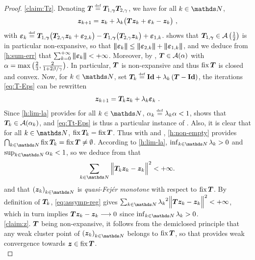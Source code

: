\begin{proof}
\noindent\ref{claim:Tz}.
Denoting $\boldsymbol T \stackrel{\mathrm{\scriptscriptstyle{def}}}{=} \boldsymbol T_{1,\boldsymbol{\gamma}} \boldsymbol T_{2,\gamma}$, we have for all $k \in \N$,
%
\begin{equation}\label{eq:T-Eps}
  \bz_{k+1} = \bz_k + \la_k \bpa{ \bT \bz_k + \bEps_{k} - \bz_k } ~,
\end{equation}
% 
with $\boldsymbol{\varepsilon}_{k} \stackrel{\mathrm{\scriptscriptstyle{def}}}{=} \boldsymbol T_{1,\boldsymbol{\gamma}} \big(  \boldsymbol T_{2,\gamma} \boldsymbol z_k + \boldsymbol{\varepsilon}_{2,k}  \big) - \boldsymbol T_{1,\boldsymbol{\gamma}} \big(  \boldsymbol T_{2,\gamma} \boldsymbol z_k  \big) + \boldsymbol{\varepsilon}_{1,k}$.  shows that $\boldsymbol T_{1,\boldsymbol{\gamma}} \in \mathcal{A}\left(  {\textstyle \frac{1}{2}}  \right)$ is in particular non-expansive, so that $\bm{|\kern-1pt|} \boldsymbol{\varepsilon}_k \bm{|\kern-1pt|} \leq \bm{|\kern-1pt|} \boldsymbol{\varepsilon}_{2,k} \bm{|\kern-1pt|} + \bm{|\kern-1pt|} \boldsymbol{\varepsilon}_{1,k} \bm{|\kern-1pt|}$, and we deduce from \ref{h:sum-err} that $\sum_{k=0}^{{+}\infty} \bm{|\kern-1pt|} \boldsymbol{\varepsilon}_{k} \bm{|\kern-1pt|} < {+}\infty$. Moreover, by , $\boldsymbol T \in \mathcal{A}(\alpha)$ with $\alpha = \max\big( {\textstyle \frac{2}{3}},{\textstyle \frac{2}{1+2\beta/\gamma}} \big)$. In particular, $\boldsymbol T$ is non-expansive and thus $\operatorname{fix} \boldsymbol T$ is closed and convex. Now, for $k \in \N$, set $\boldsymbol T_k \stackrel{\mathrm{\scriptscriptstyle{def}}}{=} \mathbf{Id} + \lambda_k \left( \boldsymbol T - \mathbf{Id} \right)$, the iterations \eqref{eq:T-Eps} can be rewritten
%
\begin{equation}\label{eq:Tt-Eps}
  \bz_{k+1} = \bT_k \bz_k + \la_k \bEps_{k} ~.
\end{equation}
% 
Since \ref{h:lim-la} provides for all $k \in \N$, $\alpha_k \stackrel{\mathrm{\scriptscriptstyle{def}}}{=} \lambda_k \alpha < 1$, \cite[Lemma 2.2 (i)]{Combettes04} shows that $\boldsymbol T_k \in \mathcal{A}(\alpha_k)$, and \eqref{eq:Tt-Eps} is thus a particular instance of \cite[Algorithm 4.1]{Combettes04}. Also, it is clear that for all $k \in \N$, $\operatorname{fix} \boldsymbol T_k = \operatorname{fix} \boldsymbol T$. Thus with  and , \ref{h:non-empty} provides $\bigcap_{k \in \N} \fix \bT_k = \fix \bT \neq \emptyset$. According to \ref{h:lim-la}, $\inf_{k \in \N} \la_k > 0$ and $\sup_{k \in \N} \al_k < 1$, so we deduce from \cite[Theorem~3.1 and Remark~3.4]{Combettes04} that
%
\begin{equation}\label{eq:assymp-reg}
\sum_{k \in \N} \bnormb{\bT_k \bz_k - \bz_k}^2 < \pinfty.
\end{equation}
% 
and that $\pa{\bz_k}_{k \in \N}$ is \textit{quasi-Fej\'er monotone} with respect to $\operatorname{fix} \boldsymbol T$. By definition of $\boldsymbol T_k$, \eqref{eq:assymp-reg} gives ${\sum_{k \in \N} {\la_k}^2 \bnormb{\bT \bz_k - \bz_k}^2 < \pinfty}$, which in turn implies $\boldsymbol T \boldsymbol z_k - \boldsymbol z_k \longrightarrow 0$ since $\inf_{k \in \N} \la_k > 0$.\\

\noindent\ref{claim:z}.
$\boldsymbol T$ being non-expansive, it follows from the demiclosed principle \cite{Browder67}\cite[Corollary~4.18]{BauschkeCombettes11} that any weak cluster point of $\pa{\bz_k}_{k\in\N}$ belongs to $\operatorname{fix} \boldsymbol T$, so that \cite[Theorem~5.5]{BauschkeCombettes11} provides weak convergence towards $\boldsymbol z \in \operatorname{fix} \boldsymbol T$.\\


\end{proof}

